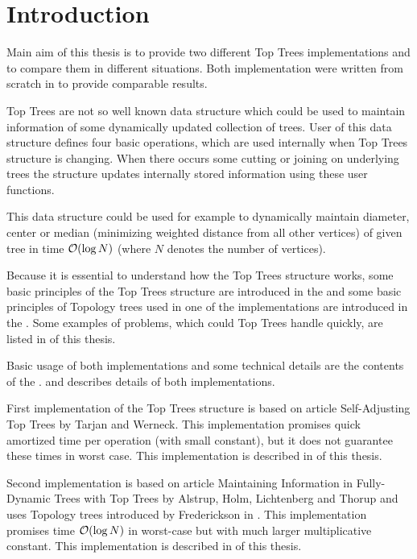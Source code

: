 \chapter*{Introduction}

Main aim of this thesis is to provide two different {\I Top Trees}
implementations and to compare them in different situations. Both implementation
were written from scratch in \Cpp{} to provide comparable results.

{\I Top Trees} are not so well known data structure which could be used to
maintain information of some dynamically updated collection of trees. User of
this data structure defines four basic operations, which are used internally
when Top Trees structure is changing. When there occurs some cutting or joining
on underlying trees the structure updates internally stored information using
these user functions.

This data structure could be used for example to dynamically maintain diameter,
center or median (minimizing weighted distance from all other vertices) of given
tree in time ${\cal O}(\log N)$ (where $N$ denotes the number of vertices).

Because it is essential to understand how the Top Trees structure works, some
basic principles of the Top Trees structure are introduced in the
 and some basic principles of Topology trees used in one of
the implementations are introduced in the . Some
examples of problems, which could Top Trees handle quickly, are listed in
 of this thesis.

Basic usage of both implementations and some technical details are the contents
of the .  and
 describes details of both implementations.

First implementation of the Top Trees structure is based on article {\I
Self-Adjusting Top Trees} \cite{SelfAdjustingTT} by Tarjan and Werneck. This
implementation promises quick amortized time per operation (with small
constant), but it does not guarantee these times in worst case. This
implementation is described in  of this thesis.

Second implementation is based on article {\I Maintaining Information in Fully-
Dynamic Trees with Top Trees} \cite{TopTrees} by Alstrup, Holm, Lichtenberg and
Thorup and uses Topology trees introduced by Frederickson in
\cite{DSforDynamicallyMaintainingRootedTrees}. This implementation promises time
${\cal O}(\log N)$ in worst-case but with much larger multiplicative constant. This
implementation is described in  of this thesis.

